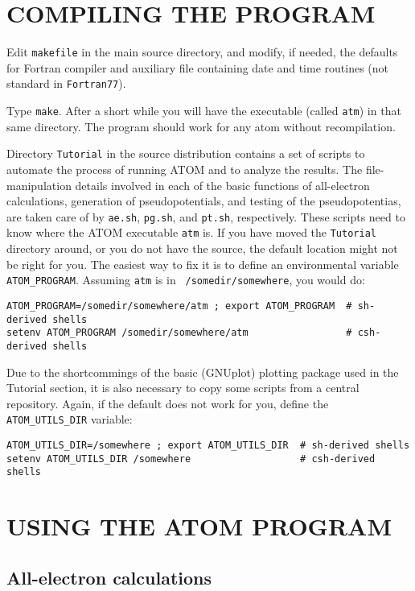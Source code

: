 \documentclass[11pt]{article}
\begin{document}
\section{COMPILING THE PROGRAM}

Edit {\tt makefile} in the main source directory, and modify, if
needed, the defaults for Fortran compiler and auxiliary file
containing date and time routines (not standard in {\tt Fortran77}).

Type {\tt make}. After a short while you will have the executable (called
{\tt atm}) in that same directory. The program should work for any atom
without recompilation. 

Directory {\tt Tutorial} in the source distribution contains a set of
scripts to automate the process of running {\sc ATOM} and to analyze
the results. The file-manipulation details involved in each of the
basic functions of all-electron calculations, generation of
pseudopotentials, and testing of the pseudopotentias, are taken care
of by {\tt ae.sh}, {\tt pg.sh}, and {\tt pt.sh}, respectively.  These
scripts need to know where the {\sc ATOM} executable {\tt atm}
is. If you have moved the {\tt Tutorial} directory around, or you do
not have the source, the default location might not be right for you.
The easiest way to fix it is to define an environmental
variable {\tt ATOM\_PROGRAM}. Assuming {\tt atm} is in {\tt
/somedir/somewhere}, you would do:
%
\begin{verbatim}
ATOM_PROGRAM=/somedir/somewhere/atm ; export ATOM_PROGRAM  # sh-derived shells
setenv ATOM_PROGRAM /somedir/somewhere/atm                 # csh-derived shells
\end{verbatim}
%

Due to the shortcommings of the basic (GNUplot) plotting package used in the
Tutorial section, it is also necessary to copy some scripts from a
central repository. Again, if the default does not work for you,
define the {\tt ATOM\_UTILS\_DIR} variable:

\begin{verbatim}
ATOM_UTILS_DIR=/somewhere ; export ATOM_UTILS_DIR  # sh-derived shells
setenv ATOM_UTILS_DIR /somewhere                   # csh-derived shells
\end{verbatim}
%

\section{USING THE ATOM PROGRAM}


\subsection{All-electron calculations}
\end{document}
